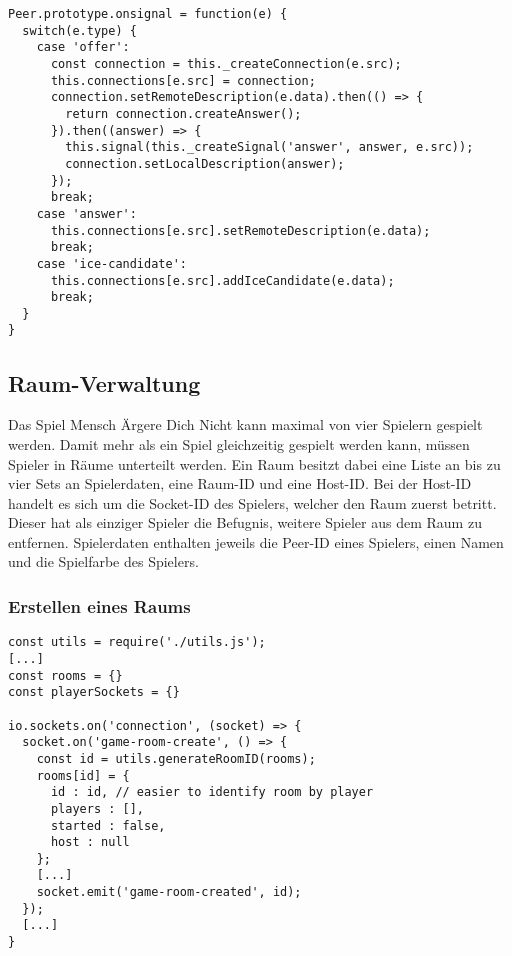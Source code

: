 \vspace{5pt}
\lstset{language=js, style=STYLE_CODE_JS}
\begin{singlespace}
\begin{lstlisting}[caption={Funktion zum Verarbeiten von Signalnachrichten -- Peer.js}, captionpos=b, label={lst:onsignal}]
Peer.prototype.onsignal = function(e) {
  switch(e.type) {
    case 'offer':
      const connection = this._createConnection(e.src);
      this.connections[e.src] = connection;
      connection.setRemoteDescription(e.data).then(() => {
        return connection.createAnswer();
      }).then((answer) => {
        this.signal(this._createSignal('answer', answer, e.src));
        connection.setLocalDescription(answer);
      });
      break;
    case 'answer':
      this.connections[e.src].setRemoteDescription(e.data);
      break;
    case 'ice-candidate':
      this.connections[e.src].addIceCandidate(e.data);
      break;
  }
}
\end{lstlisting}
\end{singlespace}

\subsection{Raum-Verwaltung}
Das Spiel \glqq{}Mensch Ärgere Dich Nicht\grqq{} kann maximal von vier Spielern gespielt werden. Damit mehr als ein Spiel gleichzeitig gespielt werden kann, müssen Spieler in \glqq{}Räume\grqq{} unterteilt werden. Ein Raum besitzt dabei eine Liste an bis zu vier Sets an Spielerdaten, eine Raum-ID und eine Host-ID. Bei der Host-ID handelt es sich um die Socket-ID des Spielers, welcher den Raum zuerst betritt. Dieser hat als einziger Spieler die Befugnis, weitere Spieler aus dem Raum zu entfernen. Spielerdaten enthalten jeweils die Peer-ID eines Spielers, einen Namen und die Spielfarbe des Spielers.

\subsubsection{Erstellen eines Raums}
\vspace{5pt}
\lstset{language=js, style=STYLE_CODE_JS}
\begin{singlespace}
\begin{lstlisting}[caption={Event zum Erstellen eines Raums -- Server.js}, captionpos=b, label={lst:imamakedaroom}]
const utils = require('./utils.js');
[...]
const rooms = {}
const playerSockets = {}

io.sockets.on('connection', (socket) => {
  socket.on('game-room-create', () => {
    const id = utils.generateRoomID(rooms);
    rooms[id] = {
      id : id, // easier to identify room by player
      players : [],
      started : false,
      host : null
    };
    [...]	
    socket.emit('game-room-created', id);
  });
  [...]
}
\end{lstlisting}
\end{singlespace}

